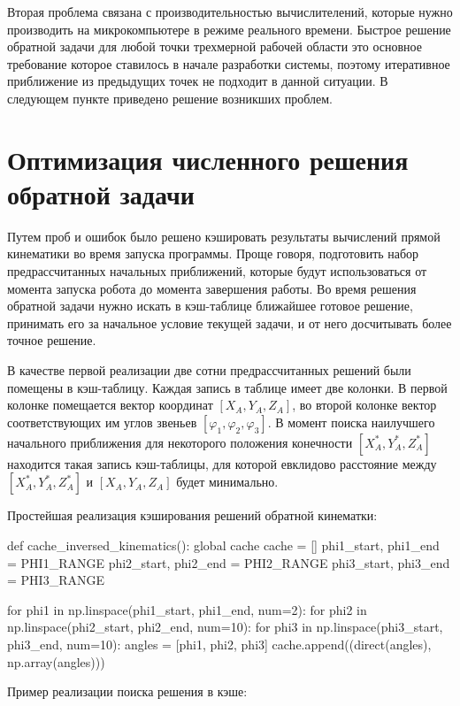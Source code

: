 \noindent Вторая проблема связана с производительностью вычислителений, которые нужно производить на микрокомпьютере в режиме реального времени. Быстрое решение обратной задачи для любой точки трехмерной рабочей области это основное требование которое ставилось в начале разработки системы, поэтому итеративное приближение из предыдущих точек не  подходит в данной ситуации. В следующем пункте приведено решение возникших проблем.

\section{Оптимизация численного решения обратной задачи}

Путем проб и ошибок было решено кэшировать результаты вычислений прямой кинематики во время запуска программы. Проще говоря, подготовить набор предрассчитанных начальных приближений, которые будут использоваться от момента запуска робота до момента завершения работы. Во время решения обратной задачи нужно искать в кэш-таблице ближайшее готовое решение, принимать его за начальное условие текущей задачи, и от него досчитывать более точное решение.

В качестве первой реализации две сотни предрассчитанных решений были помещены в кэш-таблицу. Каждая запись в таблице имеет две колонки. В первой колонке помещается вектор координат $ [X_A,Y_A,Z_A] $, во второй колонке вектор соответствующих им углов звеньев $ [\varphi_1, \varphi_2, \varphi_3] $. В момент поиска наилучшего начального приближения для некоторого положения конечности $ [X_A^*,Y_A^*,Z_A^*] $ находится такая запись кэш-таблицы, для которой евклидово расстояние между $ [X_A^*,Y_A^*,Z_A^*] $ и $ [X_A,Y_A,Z_A] $ будет минимально. 

\noindent Простейшая реализация кэширования решений обратной кинематки:

\begin{python}
def cache_inversed_kinematics():
    global cache
    cache = []
    phi1_start, phi1_end = PHI1_RANGE
    phi2_start, phi2_end = PHI2_RANGE
    phi3_start, phi3_end = PHI3_RANGE
    
    for phi1 in np.linspace(phi1_start, phi1_end, num=2):
        for phi2 in np.linspace(phi2_start, phi2_end, num=10):
            for phi3 in np.linspace(phi3_start, phi3_end, num=10):
                angles = [phi1, phi2, phi3]
                cache.append((direct(angles), np.array(angles)))
\end{python}

\noindent Пример реализации поиска решения в кэше:

